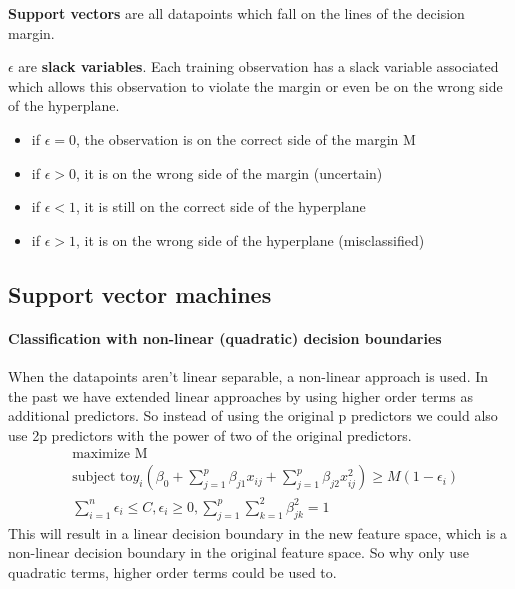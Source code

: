 \documentclass[../document.tex]{subfiles}
\begin{document}
	\textbf{Support vectors} are all datapoints which fall on the lines of the decision margin.

	$\epsilon$ are \textbf{slack variables}. Each training observation has a slack variable associated which allows this observation to violate the margin or even be on the wrong side of the hyperplane.
	\begin{itemize}
		\item if $\epsilon=0$, the observation is on the correct side of the margin M
		\item if $\epsilon>0$, it is on the wrong side of the margin (uncertain)
		\item if $\epsilon<1$, it is still on the correct side of the hyperplane
		\item if $\epsilon>1$, it is on the wrong side of the hyperplane (misclassified)
	\end{itemize}

	\subsection{Support vector machines}

	\paragraph{Classification with non-linear (quadratic) decision boundaries}
	When the datapoints aren't linear separable, a non-linear approach is used. In the past we have extended linear approaches by using higher order terms as additional predictors. So instead of using the original p predictors we could also use 2p predictors with the power of two of the original predictors.
	\begin{equation}
	\begin{split}
		&\text{maximize M}\\
		&\text{subject to} y_{i}(\beta_{0}+\sum_{j=1}^{p}\beta_{j1}x_{ij}+\sum_{j=1}^{p}\beta_{j2}x_{ij}^2)\ge M(1-\epsilon_{i})\\
		&\sum_{i=1}^{n}\epsilon_{i}\le C, \epsilon_{i}\ge 0, \sum_{j=1}^{p}\sum_{k=1}^{2}\beta_{jk}^2=1
	\end{split}
	\end{equation}
	This will result in a linear decision boundary in the new feature space, which is a non-linear decision boundary in the original feature space. So why only use quadratic terms, higher order terms could be used to.
\end{document}
